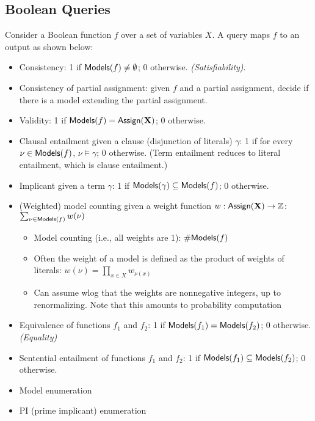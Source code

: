 
\subsection{Boolean Queries}
Consider a Boolean function $f$ over a set of variables $X$. A query maps $f$ to an output as shown below:
\begin{itemize}
    \item Consistency: 1 if $\mathsf{Models}(f) \neq \emptyset$; 0 otherwise. \textit{(Satisfiability)}. 
    \item Consistency of partial assignment: given $f$ and a partial assignment, decide if there is a model extending the partial assignment.
    \item Validity: 1 if $\mathsf{Models}(f) = \mathsf{Assign}(\mathbf{X})$; 0 otherwise.
    \item Clausal entailment given a clause (disjunction of literals) $\gamma$: 1 if for every $\nu\in\mathsf{Models}(f)$, $\nu\models\gamma$; 0 otherwise. (Term entailment reduces to literal entailment, which is clause entailment.)
    \item Implicant given a term $\gamma$: 1 if $\mathsf{Models}(\gamma) \subseteq \mathsf{Models}(f)$; 0 otherwise. 
    \item (Weighted) model counting given a weight function $w:\mathsf{Assign}(\mathbf{X})\to\mathbb{Z}$: $\sum_{\nu\in\mathsf{Models}(f)} w(\nu)$
    \begin{itemize}
        \item Model counting (i.e., all weights are 1): $\#\mathsf{Models}(f)$
        \item Often the weight of a model is defined as the product of weights of literals: $w(\nu)=\prod_{x\in X} w_{\nu(x)}$ 
\item Can assume wlog that the weights are nonnegative integers, up to renormalizing. Note that this amounts to probability computation
    \end{itemize}
    \item Equivalence of functions $f_1$ and $f_2$: 1 if $\mathsf{Models}(f_1)=\mathsf{Models}(f_2)$; 0 otherwise. \textit{(Equality)}
    \item Sentential entailment of functions $f_1$ and $f_2$: 1 if $\mathsf{Models}(f_1)\subseteq\mathsf{Models}(f_2)$; 0 otherwise.
    \item Model enumeration
    \item PI (prime implicant) enumeration

\end{itemize}
